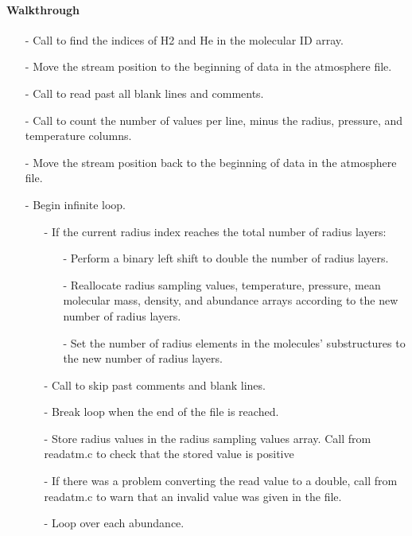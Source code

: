 \documentclass[letterpaper,12pt]{article}
\begin{document}
\paragraph{Walkthrough}
\begin{enumerate}[leftmargin=10pt, noitemsep, parsep=0pt, topsep=0ex]
\item[-] Call  to find the indices of H2 and He in the molecular ID array.
\item[-] Move the stream position to the beginning of data in the atmosphere file.
\item[-] Call  to read past all blank lines and comments.
\item[-] Call  to count the number of values per line, minus the radius, pressure, and temperature columns.
\item[-] Move the stream position back to the beginning of data in the atmosphere file.
\item[-] Begin infinite loop.
\begin{enumerate}[leftmargin=10pt, noitemsep, parsep=0pt, topsep=0ex]
\item[-] If the current radius index reaches the total number of radius layers:
\begin{enumerate}[leftmargin=10pt, noitemsep, parsep=0pt, topsep=0ex]
\item[-] Perform a binary left shift to double the number of radius layers.
\item[-] Reallocate radius sampling values, temperature, pressure, mean molecular mass, density, and abundance arrays according to the new number of radius layers.
\item[-] Set the number of radius elements in the molecules' substructures to the new number of radius layers.
\end{enumerate}
\item[-] Call  to skip past comments and blank lines.
\item[-] Break loop when the end of the file is reached.
\item[-] Store radius values in the radius sampling values array. Call  from readatm.c to check that the stored value is positive
\item[-] If there was a problem converting the read value to a double, call  from readatm.c to warn that an invalid value was given in the file.
\item[-] Loop over each abundance.
\begin{enumerate}[leftmargin=10pt, noitemsep, parsep=0pt, topsep=0ex]

\end{enumerate}
\end{enumerate}
\end{enumerate}
\end{document}
